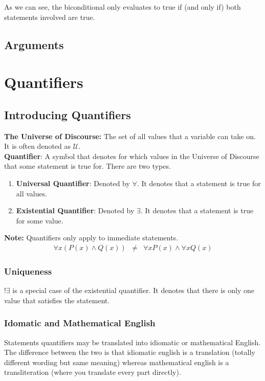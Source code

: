 \documentclass{article}
\begin{document}
As we can see, the biconditional only evaluates to true if (and only if) both statements
involved are true.

\subsection{Arguments}

\newpage
\section{Quantifiers}
\subsection{Introducing Quantifiers}
\textbf{The Universe of Discourse:} The set of all values that a variable can take on. It is often denoted as $\mathcal{U}$. \\

\noindent \textbf{Quantifier}: A symbol that denotes for which values in the Universe of Discourse that some statement is true for. 
There are two types.
\begin{enumerate}
    \item \textbf{Universal Quantifier}: Denoted by $\forall$. It denotes that a statement is true for all values.
    \item \textbf{Existential Quantifier}: Denoted by $\exists$. It denotes that a statement is true for some value.
\end{enumerate}

\noindent \textbf{Note:} Quantifiers only apply to immediate statements.
\begin{eqnarray} \nonumber
    \forall x (P(x) \land Q(x)) &\neq& \forall x P(x) \land \forall x Q(x) 
\end{eqnarray}

\subsubsection{Uniqueness}
$!\exists$ is a special case of the existential quantifier. It denotes that there is only
one value that satisfies the statement.

\subsubsection{Idomatic and Mathematical English}
Statements quantifiers may be translated into idiomatic or mathematical English.
The difference between the two is that idiomatic english is a translation (totally
different wording but same meaning) whereas mathematical english is a transliteration
(where you translate every part directly). \\
\end{document}

